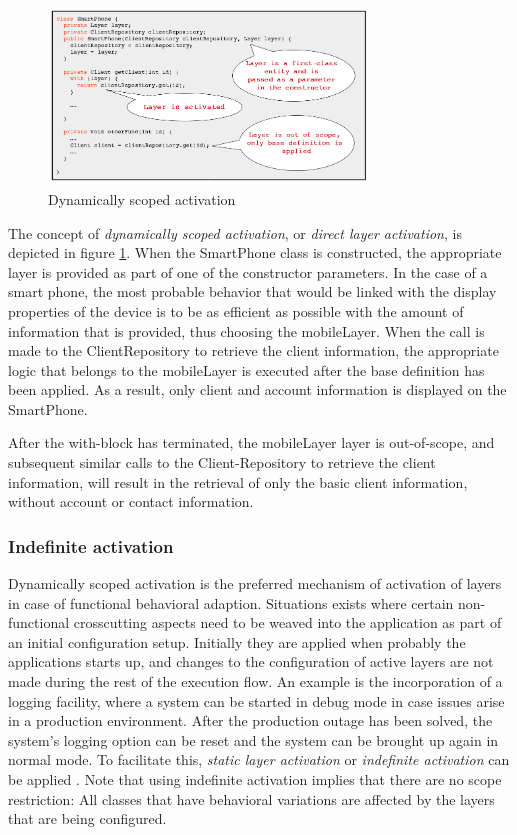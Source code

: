 \documentclass{acm_proc_article-sp}
\begin{document}
\begin{figure}[H]
\centering
\includegraphics[width=85mm]{dynamic_activation2.png}
\caption{Dynamically scoped activation}
\label{fig:dynamically_scoped_activation}
\end{figure}

The concept of \textit{dynamically scoped activation}, or \textit{direct layer activation}, is depicted in figure \ref{fig:dynamically_scoped_activation}. When the SmartPhone class is constructed, the appropriate layer is provided as part of one of the constructor parameters. In the case of a smart phone, the most probable behavior that would be linked with the display properties of the device is to be as efficient as possible with the amount of information that is provided, thus choosing the mobileLayer. When the call is made to the ClientRepository to retrieve the client information, the appropriate logic that belongs to the mobileLayer is executed after the base definition has been applied. As a result, only client and account information is displayed on the SmartPhone. 

After the with-block has terminated, the mobileLayer layer is out-of-scope, and subsequent similar calls to the Client-Repository to retrieve the client information, will result in the retrieval of only the basic client information, without account or contact information.

\subsubsection{Indefinite activation}
\label{indefinite_activation}
Dynamically scoped activation is the preferred mechanism of activation of layers in case of functional behavioral adaption. Situations exists where certain non-functional crosscutting aspects need to be weaved into the application as part of an initial configuration setup. Initially they are applied when probably the applications starts up, and changes to the configuration of active layers are not made during the rest of the execution flow. An example is the incorporation of a logging facility, where a system can be started in debug mode in case issues arise in a production environment. After the production outage has been solved, the system's logging option can be reset and the system can be brought up again in normal mode. To facilitate this, \textit{static layer activation} or \textit{indefinite activation} can be applied  \cite{SALVANESCHI20121801}. Note that using indefinite activation implies that there are no scope restriction: All classes that have behavioral variations are affected by the layers that are being configured. 
\end{document}
